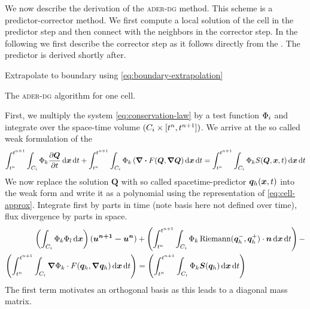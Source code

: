 We now describe the derivation of the \textsc{ader-dg} method.
This scheme is a predictor-corrector method.
We first compute a local solution of the cell in the predictor step and then connect with the neighbors in the corrector step.
In the following we first describe the corrector step as it follows directly from the \pde.
The predictor is derived shortly after.

\begin{algorithm}[H]
  \begin{algorithmic}
        {Extrapolate to boundary using \cref{eq:boundary-extrapolation}}
  \end{algorithmic}
  \caption{The \textsc{ader-dg} algorithm for one cell.}
\end{algorithm}

First, we multiply the system \cref{eq:conservation-law} by a test function $\Phi_{i}$ and integrate over the space-time volume $(C_{i} \times [t^n, t^{n+1}])$.
We arrive at the so called weak formulation of the \pde\
\begin{equation}
  \label{eq:weak-pde}
\intdt{\intdcell{
\testfunction{k} \pdv{\Q}{t}
}}
+
\intdt{\intdcell{
    \testfunction{k} \left( \div{F(\Q, \gradQ} \right)
}}
=
\intdt{\intdcell{
    \testfunction{k} S(\Q, \bm{x}, t)
}}
\end{equation}
We now replace the solution $\bm{Q}$ with so called spacetime-predictor $\bm{q}_{h} (\bm{x},t)$ into the weak form and write it as a polynomial using the representation of \cref{eq:cell-approx}.
Integrate first by parts in time (note basis here not defined over time), flux divergence by parts in space.
\begin{align}
\begin{split}
\label{eq:corrector}
\left(
\intdcell{
  \testfunction{k} \sbasis{l}
}
\right)
(\bm{u^{n+1} - u^{n}})
&+
\left(\intdt{\intdcell{
      \testfunction{k} \Riemann(\stpredictor^-, \stpredictor^+) \cdot \normal
}}\right)
-\\
\left(\intdt{\intdcell{
    \gradient{\testfunction{k}} \cdot  \flux(\stpredictor, \gradient{\stpredictor}) %
}}\right)
&=
\left(\intdt{\intdcell{
      \testfunction{k} \source(\stpredictor)
}}\right)
\end{split}
\end{align}
The first term motivates an orthogonal basis as this leads to a diagonal mass matrix.

